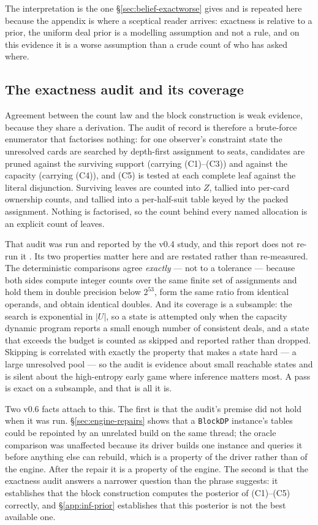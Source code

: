 The interpretation is the one \S\ref{sec:belief-exactworse} gives and is repeated
here because the appendix is where a sceptical reader arrives: exactness is
relative to a prior, the uniform deal prior is a modelling assumption and not a
rule, and on this evidence it is a worse assumption than a crude count of who has
asked where.

\subsection{The exactness audit and its coverage}
\label{app:inf-audit}

Agreement between the count law and the block construction is weak evidence,
because they share a derivation. The audit of record is therefore a brute-force
enumerator that factorises nothing: for one observer's constraint state the
unresolved cards are searched by depth-first assignment to seats, candidates are
pruned against the surviving support (carrying (C1)--(C3)) and against the
capacity (carrying (C4)), and (C5) is tested at each complete leaf against the
literal disjunction. Surviving leaves are counted into $Z$, tallied into per-card
ownership counts, and tallied into a per-half-suit table keyed by the packed
assignment. Nothing is factorised, so the count behind every named allocation is
an explicit count of leaves.

That audit was run and reported by the v0.4 study, and this report does not
re-run it \cite{fishbot04}. Its two properties matter here and are restated
rather than re-measured. The deterministic comparisons agree \emph{exactly} ---
not to a tolerance --- because both sides compute integer counts over the same
finite set of assignments and hold them in double precision below $2^{53}$, form
the same ratio from identical operands, and obtain identical doubles. And its
coverage is a subsample: the search is exponential in $|U|$, so a state is
attempted only when the capacity dynamic program reports a small enough number of
consistent deals, and a state that exceeds the budget is counted as skipped and
reported rather than dropped. Skipping is correlated with exactly the property
that makes a state hard --- a large unresolved pool --- so the audit is evidence
about small reachable states and is silent about the high-entropy early game
where inference matters most. A pass is exact on a subsample, and that is all it
is.

Two v0.6 facts attach to this. The first is that the audit's premise did not hold
when it was run. \S\ref{sec:engine-repairs} shows that a \texttt{BlockDP}
instance's tables could be repointed by an unrelated build on the same thread;
the oracle comparison was unaffected because its driver builds one instance and
queries it before anything else can rebuild, which is a property of the driver
rather than of the engine. After the repair it is a property of the engine. The
second is that the exactness audit answers a narrower question than the phrase
suggests: it establishes that the block construction computes the posterior of
(C1)--(C5) correctly, and \S\ref{app:inf-prior} establishes that this posterior
is not the best available one.

